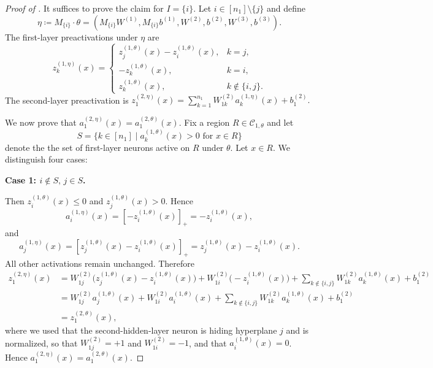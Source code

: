 \documentclass{article}
\theoremstyle{definition}
\newcommand{\weights}[1]{W^{(#1)}}
\newcommand{\bias}[1]{b^{(#1)}}
\newcommand{\complex}{\mathcal{C}}
\newcommand{\activation}[1]{a^{(#1)}}
\newcommand{\preactivation}[1]{z^{(#1)}}
\begin{document}
\begin{proof}[Proof of ] 
It suffices to prove the claim for $I=\{i\}.$
Let $i \in [n_1]\setminus\{j\}$ and define
\[
\eta \coloneqq M_{\{i\}} \cdot \theta = (M_{\{i\}}\weights{1}, M_{\{i\}} \bias{1}, \weights{2}, \bias{2}, \weights{3}, \bias{3}).
\]
%
The first-layer preactivations under 
$\eta$ are 
\[
\preactivation{1,\eta}_k(x) =
\begin{cases}
\preactivation{1,\theta}_j(x) - \preactivation{1,\theta}_i(x), & k = j,\\[1mm]
-\preactivation{1,\theta}_k(x), & k = i,\\[1mm]
\preactivation{1,\theta}_k(x), & k \notin \{i,j\}.
\end{cases}
\]
%
The second-layer preactivation is
\(
\preactivation{2,\eta}_1(x) = \sum_{k=1}^{n_1} \weights{2}_{1k} \activation{1,\eta}_k(x) + \bias{2}_1.
\)


We now prove that $\activation{2,\eta}_1(x) = \activation{2,\theta}_1(x)$. 
%
%
Fix a region $R \in \complex_{1,\theta}$ and let
$$
S = \{ k \in [n_1] \mid \activation{1,\theta}_k(x) > 0 \text{ for } x \in R \}
$$
denote the the set of first-layer neurons active on $R$ under $\theta$. 
% 
Let $x \in R$. We distinguish four cases:

\medskip
\noindent \textbf{Case 1: $i \notin S,\, j \in S$.}  

Then $\preactivation{1,\theta}_i(x) \leq 0$ and $\preactivation{1,\theta}_j(x) > 0$. Hence
\[
\activation{1,\eta}_i(x) = \left[-\preactivation{1,\theta}_i(x)\right]_+ = -\preactivation{1,\theta}_i(x),
\]
and
\[
\activation{1,\eta}_j(x) = \left[\preactivation{1,\theta}_j(x) - \preactivation{1,\theta}_i(x)\right]_+
= \preactivation{1,\theta}_j(x) - \preactivation{1,\theta}_i(x).
\]
All other activations remain unchanged. Therefore
\[
\begin{aligned}
\preactivation{2,\eta}_1(x)
&=
\weights{2}_{1j}\big(\preactivation{1,\theta}_j(x) - \preactivation{1,\theta}_i(x)\big)
+ \weights{2}_{1i}\big(-\preactivation{1,\theta}_i(x)\big)
+ \sum_{k \notin \{i,j\}} \weights{2}_{1k} \activation{1,\theta}_k(x)
+ \bias{2}_1 \\
&=
\weights{2}_{1j}
\activation{1,\theta}_j(x)
+ \weights{2}_{1i}\activation{1,\theta}_i(x)
+ \sum_{k \notin \{i,j\}} \weights{2}_{1k} \activation{1,\theta}_k(x)
+ \bias{2}_1 \\
&= \preactivation{2,\theta}_1(x),
\end{aligned}
\]
where we used that 
the second-hidden-layer neuron is hiding hyperplane $j$ and is normalized, so that $\weights{2}_{1j} =+1$ and $\weights{2}_{1i}= -1$, and that 
$\activation{1,\theta}_i(x)=0$. 
Hence
\(
\activation{2,\eta}_1(x) = \activation{2,\theta}_1(x).
\)


\end{proof}
\end{document}

